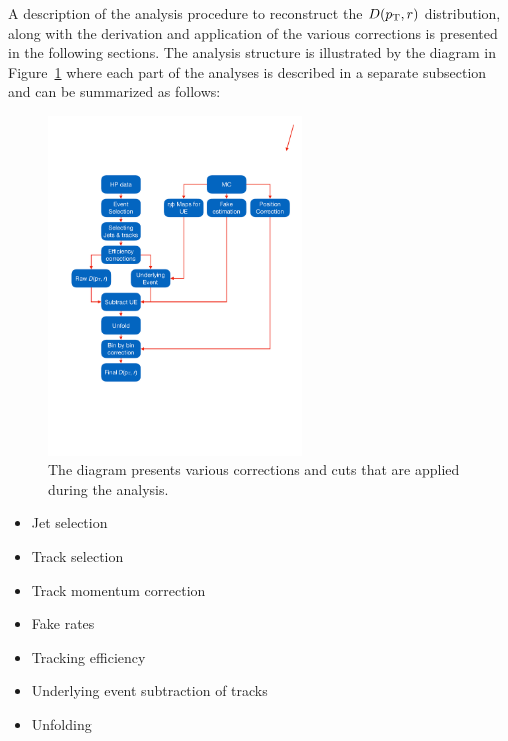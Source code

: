 
A description of the analysis procedure to reconstruct the $\mbox{$D( \mbox{$p_{\mathrm{T}}$}, r)$}$ distribution, along with the derivation and application of the various corrections is presented in the following sections.
The analysis structure is illustrated by the diagram in Figure~\ref{fig:analysis_flow} where each part of the analyses is described in a separate subsection and can be summarized as follows: 


\begin{figure}
\centering
\includegraphics[width=0.6\textwidth]{figures/main/general/Shape_analyses_flow}
\caption{The diagram presents various corrections and cuts that are applied during the analysis.}
\label{fig:analysis_flow}
\end{figure}


\begin{itemize}
\item Jet selection
\item Track selection
\item Track momentum correction
\item Fake rates
\item Tracking efficiency
\item Underlying event subtraction of tracks
\item Unfolding
\end{itemize}




